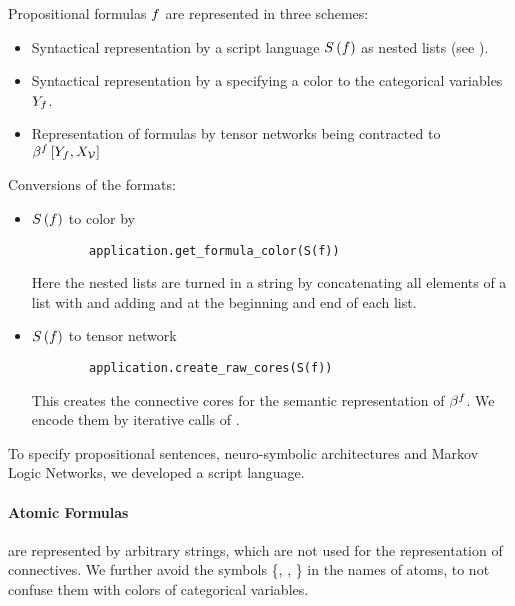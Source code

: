 
Propositional formulas $f$ are represented in three schemes:
\begin{itemize}
    \item Syntactical representation by a script language $S\left(f\right)$ as nested lists (see ).
    \item Syntactical representation by a  specifying a color to the categorical variables $Y_{f}$.
    \item Representation of formulas by tensor networks being contracted to $\beta^{f}\left[Y_{f},X_{\mathcal{V}}\right]$
\end{itemize}

Conversions of the formats:
\begin{itemize}
    \item $S\left(f\right)$ to color by
    \begin{lstlisting}
        application.get_formula_color(S(f))
    \end{lstlisting}
    Here the nested lists are turned in a string by concatenating all elements of a list with \stringof{\_} and adding \stringof{[} and \stringof{]} at the beginning and end of each list.
    \item  $S\left(f\right)$ to tensor network
    \begin{lstlisting}
        application.create_raw_cores(S(f))
    \end{lstlisting}
    This creates the connective cores for the semantic representation of $\beta^{f}$.
    We encode them by iterative calls of .
\end{itemize}


\label{subsec:scriptLanguage}

To specify propositional sentences, neuro-symbolic architectures and Markov Logic Networks, we developed a script language.


\paragraph{Atomic Formulas} are represented by arbitrary strings, which are not used for the representation of connectives.
We further avoid the symbols \{\stringof{(}, \stringof{)}, \stringof{\_}\} in the names of atoms, to not confuse them with colors of categorical variables.

